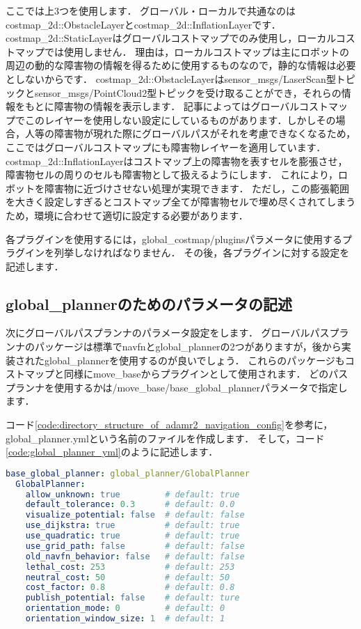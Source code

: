 \documentclass[{../../master}]{subfiles}
\begin{document}
ここでは上3つを使用します．
グローバル・ローカルで共通なのは\textsf{costmap\_2d::ObstacleLayer}と\textsf{costmap\_2d::InflationLayer}です．
\textsf{costmap\_2d::StaticLayer}はグローバルコストマップでのみ使用し，ローカルコストマップでは使用しません．
理由は，ローカルコストマップは主にロボットの周辺の動的な障害物の情報を得るために使用するものなので，静的な情報は必要としないからです．
\textsf{costmap\_2d::ObstacleLayer}は\textsf{sensor\_msgs/LaserScan}型トピックと\textsf{sensor\_msgs/PointCloud2}型トピックを受け取ることができ，それらの情報をもとに障害物の情報を表示します．
記事によってはグローバルコストマップでこのレイヤーを使用しない設定にしているものがあります．しかしその場合，人等の障害物が現れた際にグローバルパスがそれを考慮できなくなるため，ここではグローバルコストマップにも障害物レイヤーを適用しています．
\textsf{costmap\_2d::InflationLayer}はコストマップ上の障害物を表すセルを膨張させ，障害物セルの周りのセルも障害物として扱えるようにします．
これにより，ロボットを障害物に近づけさせない処理が実現できます．
ただし，この膨張範囲を大きく設定しすぎるとコストマップ全てが障害物セルで埋め尽くされてしまうため，環境に合わせて適切に設定する必要があります．

各プラグインを使用するには，\textsf{global\_costmap/plugins}パラメータに使用するプラグインを列挙しなければなりません．
その後，各プラグインに対する設定を記述します．

\subsection{\textsf{global\_planner}のためのパラメータの記述}

次にグローバルパスプランナのパラメータ設定をします．
グローバルパスプランナのパッケージは標準で\textsf{navfn}と\textsf{global\_planner}の2つがありますが，後から実装された\textsf{global\_planner}を使用するのが良いでしょう．
これらのパッケージもコストマップと同様に\textsf{move\_base}からプラグインとして使用されます．
どのパスプランナを使用するかは\textsf{/move\_base/base\_global\_planner}パラメータで指定します．

コード\ref{code:directory_structure_of_adamr2_navigation_config}を参考に，\textsf{global\_planner.yml}という名前のファイルを作成します．
そして，コード\ref{code:global_planner_yml}のように記述します．

\begin{lstlisting}[language=YAML, label=code:global_planner_yml, caption=\textsf{global\_planner.yml}]
base_global_planner: global_planner/GlobalPlanner
  GlobalPlanner:
    allow_unknown: true         # default: true
    default_tolerance: 0.3      # default: 0.0
    visualize_potential: false  # default: false
    use_dijkstra: true          # default: true
    use_quadratic: true         # default: true
    use_grid_path: false        # default: false
    old_navfn_behavior: false   # default: false
    lethal_cost: 253            # default: 253
    neutral_cost: 50            # default: 50
    cost_factor: 0.8            # default: 0.8
    publish_potential: false    # default: ture
    orientation_mode: 0         # default: 0
    orientation_window_size: 1  # default: 1
\end{lstlisting}
\end{document}

